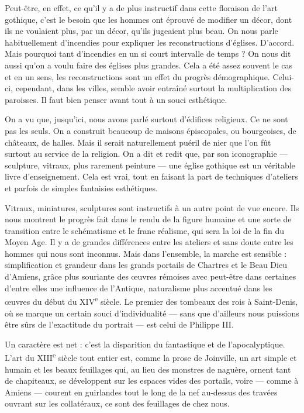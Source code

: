 \documentclass[french,twoside]{book} %
\begin{document}
Peut-être, en effet, ce qu’il y a de plus instructif dans cette floraison de l’art gothique, c’est le besoin que les hommes ont éprouvé de modifier un décor, dont ils ne voulaient plus, par un décor, qu’ils jugeaient plus beau. On nous parle habituellement d’incendies pour expliquer les reconstructions d’églises. D’accord. Mais pourquoi tant d’incendies en un si court intervalle de temps ? On nous dit aussi qu’on a voulu faire des églises plus grandes. Cela a été assez souvent le cas et en un sens, les reconstructions sont un effet du progrès démographique. Celui-ci, cependant, dans les villes, semble avoir entraîné surtout la multiplication des paroisses. Il faut bien penser avant tout à un souci esthétique.\par
On a vu que, jusqu’ici, nous avons parlé surtout d’édifices religieux. Ce ne sont pas les seuls. On a construit beaucoup de maisons épiscopales, ou bourgeoises, de châteaux, de halles. Mais il serait naturellement puéril de nier que l’on fût surtout au service de la religion. On a dit et redit que, par son iconographie — sculpture, vitraux, plus rarement peinture — une église gothique est un véritable livre d’enseignement. Cela est vrai, tout en faisant la part de techniques d’ateliers et parfois de simples fantaisies esthétiques.\par
Vitraux, miniatures, sculptures sont instructifs à un autre point de vue encore. Ils nous montrent le progrès fait dans le rendu de la figure humaine et une sorte de transition entre le schématisme et le franc réalisme, qui sera la loi de la fin du Moyen Age. Il y a de grandes différences entre les ateliers et sans doute entre les hommes qui nous sont inconnus. Mais dans l’ensemble, la marche est sensible : simplification et grandeur dans les grands portails de Chartres et le Beau Dieu d’Amiens, grâce plus souriante des œuvres rémoises avec peut-être dans certaines d’entre elles une influence de l’Antique, naturalisme plus accentué dans les œuvres du début du XIV\textsuperscript{e} siècle. Le premier des tombeaux des rois à Saint-Denis, où se marque un certain souci d’individualité — sans que d’ailleurs nous puissions être sûrs de l’exactitude du portrait — est celui de Philippe III.\par
Un caractère est net : c’est la disparition du fantastique et de l’apocalyptique. L’art du XIII\textsuperscript{e} siècle tout entier est, comme la prose de Joinville, un art simple et humain et les beaux feuillages qui, au lieu des monstres de naguère, ornent tant de chapiteaux, se développent sur les espaces vides des portails, voire — comme à Amiens — courent en guirlandes tout le long de la nef au-dessus des travées ouvrant sur les collatéraux, ce sont des feuillages de chez nous.\par
\end{document}
